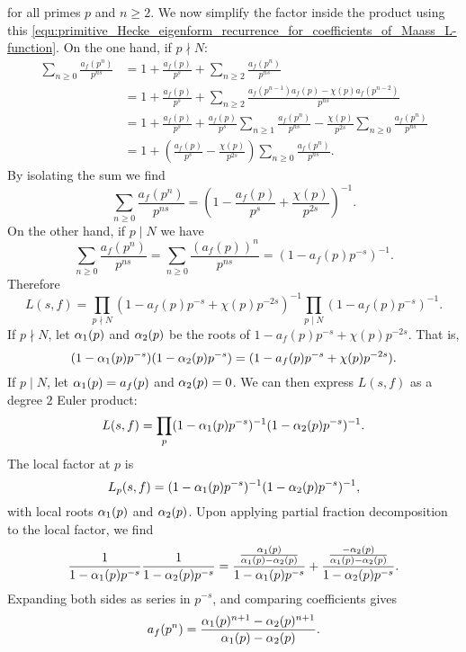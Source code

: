       for all primes $p$ and $n \ge 2$. We now simplify the factor inside the product using this \cref{equ:primitive_Hecke_eigenform_recurrence_for_coefficients_of_Maass_L-function}. On the one hand, if $p \nmid N$:
      \begin{align*}
        \sum_{n \ge 0}\frac{a_{f}(p^{n})}{p^{ns}} &= 1+\frac{a_{f}(p)}{p^{s}}+\sum_{n \ge 2}\frac{a_{f}(p^{n})}{p^{ns}} \\
        &= 1+\frac{a_{f}(p)}{p^{s}}+\sum_{n \ge 2}\frac{a_{f}(p^{n-1})a_{f}(p)-\chi(p)a_{f}(p^{n-2})}{p^{ns}} \\
        &= 1+\frac{a_{f}(p)}{p^{s}}+\frac{a_{f}(p)}{p^{s}}\sum_{n \ge 1}\frac{a_{f}(p^{n})}{p^{ns}}-\frac{\chi(p)}{p^{2s}}\sum_{n \ge 0}\frac{a_{f}(p^{n})}{p^{ns}} \\
        &= 1+\left(\frac{a_{f}(p)}{p^{s}}-\frac{\chi(p)}{p^{2s}}\right)\sum_{n \ge 0}\frac{a_{f}(p^{n})}{p^{ns}}.
      \end{align*}
      By isolating the sum we find
      \[
        \sum_{n \ge 0}\frac{a_{f}(p^{n})}{p^{ns}} = \left(1-\frac{a_{f}(p)}{p^{s}}+\frac{\chi(p)}{p^{2s}}\right)^{-1}.
      \]
      On the other hand, if $p \mid N$ we have
      \[
        \sum_{n \ge 0}\frac{a_{f}(p^{n})}{p^{ns}} = \sum_{n \ge 0}\frac{(a_{f}(p))^{n}}{p^{ns}} = \left(1-a_{f}(p)p^{-s}\right)^{-1}.
      \]
      Therefore
      \[
        L(s,f) = \prod_{p \nmid N}(1-a_{f}(p)p^{-s}+\chi(p)p^{-2s})^{-1}\prod_{p \mid N}(1-a_{f}(p)p^{-s})^{-1}.
      \]
      If $p \nmid N$, let $\alpha_{1}(p)$ and $\alpha_{2}(p)$ be the roots of $1-a_{f}(p)p^{-s}+\chi(p)p^{-2s}$. That is,
      \[
        (1-\alpha_{1}(p)p^{-s})(1-\alpha_{2}(p)p^{-s}) = (1-a_{f}(p)p^{-s}+\chi(p)p^{-2s}).
      \]
      If $p \mid N$, let $\alpha_{1}(p) = a_{f}(p)$ and $\alpha_{2}(p) = 0$. We can then express $L(s,f)$ as a degree $2$ Euler product:
      \[
        L(s,f) = \prod_{p}(1-\alpha_{1}(p)p^{-s})^{-1}(1-\alpha_{2}(p)p^{-s})^{-1}.
      \]
      The local factor at $p$ is 
      \[
        L_{p}(s,f) = (1-\alpha_{1}(p)p^{-s})^{-1}(1-\alpha_{2}(p)p^{-s})^{-1},
      \]
      with local roots $\alpha_{1}(p)$ and $\alpha_{2}(p)$. Upon applying partial fraction decomposition to the local factor, we find
      \[
        \frac{1}{1-\alpha_{1}(p)p^{-s}}\frac{1}{1-\alpha_{2}(p)p^{-s}} = \frac{\frac{\alpha_{1}(p)}{\alpha_{1}(p)-\alpha_{2}(p)}}{1-\alpha_{1}(p)p^{-s}}+\frac{\frac{-\alpha_{2}(p)}{\alpha_{1}(p)-\alpha_{2}(p)}}{1-\alpha_{2}(p)p^{-s}}.
      \]
      Expanding both sides as series in $p^{-s}$, and comparing coefficients gives
      \begin{equation}\label{equ:Hecke_Maass_L_function_coefficient_formula}
        a_{f}(p^{n}) = \frac{\alpha_{1}(p)^{n+1}-\alpha_{2}(p)^{n+1}}{\alpha_{1}(p)-\alpha_{2}(p)}.
      \end{equation}
